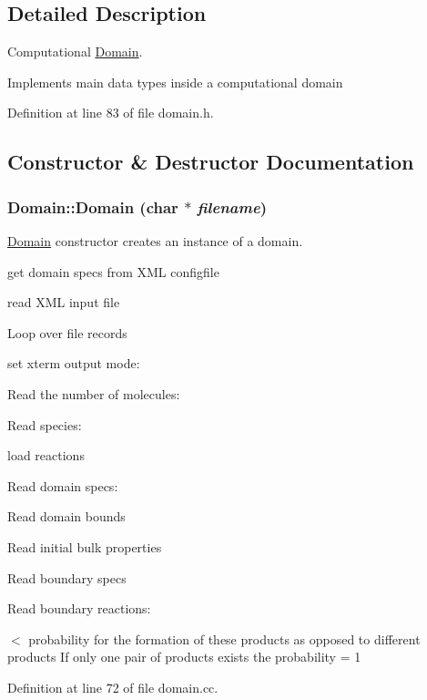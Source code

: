 \subsection{Detailed Description}
Computational \hyperlink{classDomain}{Domain}. 

Implements main data types inside a computational domain 

Definition at line 83 of file domain.h.

\subsection{Constructor \& Destructor Documentation}
\hypertarget{classDomain_00a6f779e32f40a899020a4114eb00c9}{
\subsubsection[{Domain}]{\setlength{\rightskip}{0pt plus 5cm}Domain::Domain (char $\ast$ {\em filename})}}
\label{classDomain_00a6f779e32f40a899020a4114eb00c9}


\hyperlink{classDomain}{Domain} constructor creates an instance of a domain. 



get domain specs from XML configfile

read XML input file

Loop over file records

set xterm output mode:

Read the number of molecules:

Read species:

load reactions

Read domain specs:

Read domain bounds

Read initial bulk properties

Read boundary specs

Read boundary reactions:

$<$ probability for the formation of these products as opposed to different products If only one pair of products exists the probability = 1

Definition at line 72 of file domain.cc.

